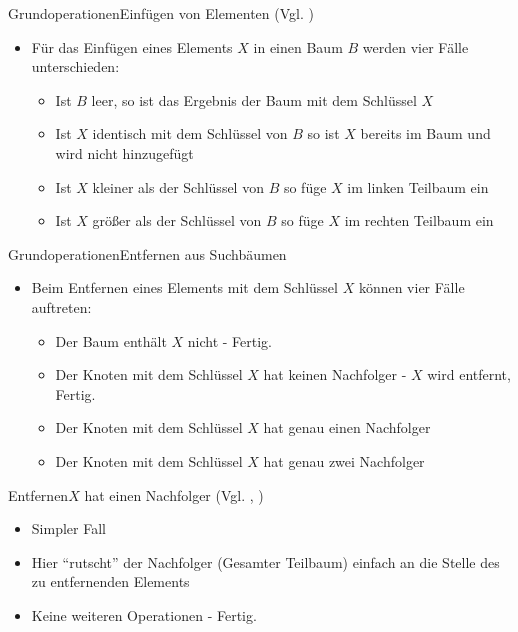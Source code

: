 \begin{frame}{Grundoperationen}{Einfügen von Elementen (Vgl. \cite{fahr:list})}
	\begin{itemize}
		\item Für das Einfügen eines Elements $X$ in einen Baum $B$ werden vier Fälle unterschieden:
		\begin{itemize}
			\item Ist $B$ leer, so ist das Ergebnis der Baum mit dem Schlüssel $X$
			\item Ist $X$ identisch mit dem Schlüssel von $B$ so ist $X$ bereits im Baum und wird nicht hinzugefügt
			\item Ist $X$ kleiner als der Schlüssel von $B$ so füge $X$ im linken Teilbaum ein
			\item Ist $X$ größer als der Schlüssel von $B$ so füge $X$ im rechten Teilbaum ein
		\end{itemize}
	\end{itemize}
\end{frame}

\begin{frame}{Grundoperationen}{Entfernen aus Suchbäumen}
\begin{itemize}
	\item Beim Entfernen eines Elements mit dem Schlüssel $X$ können vier Fälle auftreten:
	\begin{itemize}
		\item Der Baum enthält $X$ nicht - Fertig.
		\item Der Knoten mit dem Schlüssel $X$ hat keinen Nachfolger - $X$ wird entfernt, Fertig.
		\item Der Knoten mit dem Schlüssel $X$ hat genau einen Nachfolger
		\item Der Knoten mit dem Schlüssel $X$ hat genau zwei Nachfolger
	\end{itemize}
\end{itemize}
\end{frame}

\begin{frame}{Entfernen}{$X$ hat einen Nachfolger (Vgl. \cite{tree1}, \cite{tree2})}
	\begin{itemize}
		\item Simpler Fall
		\item Hier "`rutscht"' der Nachfolger (Gesamter Teilbaum) einfach an die Stelle des zu entfernenden Elements
		\item Keine weiteren Operationen - Fertig.
	\end{itemize}
\end{frame}

